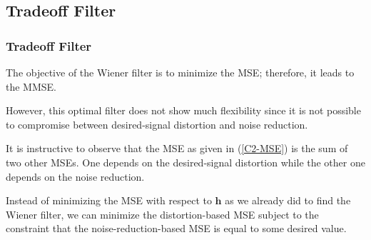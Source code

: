 \documentclass[10pt,pdflatex,headrule,landscape]{beamer}
\begin{document}
\subsection{Tradeoff Filter}
\begin{frame}
    \frametitle{Tradeoff Filter}

The objective of the Wiener filter is to minimize the MSE; therefore, it leads to the MMSE.

However, this optimal filter does not show much flexibility since it is not possible to compromise between desired-signal distortion and noise reduction.

It is instructive to observe that the MSE as given in (\ref{C2-MSE}) is the sum of two other MSEs. One depends on the desired-signal distortion while the other one depends on the noise reduction.

Instead of minimizing the MSE with respect to $\mathbf{h}$ as we already did to find the Wiener filter, we can minimize the distortion-based MSE subject to the constraint that the noise-reduction-based MSE is equal to some desired value.

\end{frame}
\end{document}
